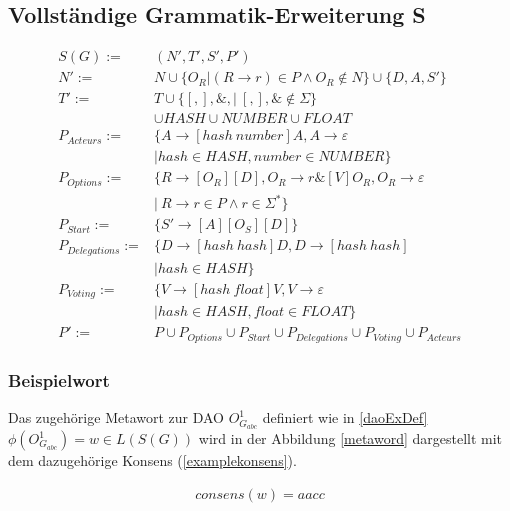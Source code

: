 \documentclass[a4paper,12pt]{report}
\begin{document}
\subsection{Vollständige Grammatik-Erweiterung S}
% 

\begin{align}
  S(G) :=& (N', T', S', P') \\
  N' :=& N \cup \{ O_R | (R\rightarrow r)\in P\land O_R \notin N\}\cup\{D, A, S'\}\\
  T' :=& T \cup \{[ , ], \&, |\ [,],\& \notin \Sigma \} \nonumber\\
  &\cup HASH
  \cup NUMBER
  \cup FLOAT 
  \\
  P_{Acteurs} :=& \{A\rightarrow[hash\ number]A,A\rightarrow \varepsilon \\
  &| hash\in HASH, number\in NUMBER\} \\
  P_{Options} :=& \{R \rightarrow [O_R][D], O_R \rightarrow r\& [V] O_R, O_R \rightarrow \varepsilon \ \nonumber\\
  &\vert\ R\rightarrow r\in P \land r\in \Sigma^*\} \\
  P_{Start} :=& \{S'\rightarrow [A][O_S][D]\} \\
  P_{Delegations} :=& \{D\rightarrow [hash\ hash]D,D\rightarrow [hash\ hash]\nonumber\\&| hash\in HASH\} \\
  P_{Voting} :=& \{V\rightarrow [hash\ float]V, V \rightarrow \varepsilon \nonumber \\&| hash\in HASH, float\in FLOAT\} \\
  P' :=& P
  \cup P_{Options} 
  \cup P_{Start} 
  \cup P_{Delegations} 
  \cup P_{Voting} 
  \cup P_{Acteurs}
\end{align}

\subsubsection*{Beispielwort}
Das zugehörige Metawort zur DAO $O_{G_{abc}}^1$ definiert wie in \ref{daoExDef} $\phi(O_{G_{abc}}^1) = w \in L(S(G))$ wird in der Abbildung \ref{metaword} dargestellt mit dem dazugehörige Konsens (\ref{examplekonsens}).

\begin{eqnarray}
consens(w) = aacc \label{examplekonsens}
\end{eqnarray}
\end{document}

